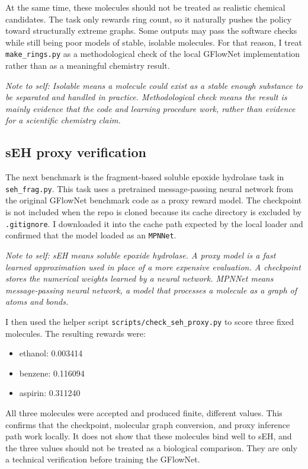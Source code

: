 \documentclass{article}
\begin{document}
At the same time, these molecules should not be treated as realistic chemical candidates. The task only rewards ring count, so it naturally pushes the policy toward structurally extreme graphs. Some outputs may pass the software checks while still being poor models of stable, isolable molecules. For that reason, I treat \texttt{make\_rings.py} as a methodological check of the local GFlowNet implementation rather than as a meaningful chemistry result.

\textit{Note to self: Isolable means a molecule could exist as a stable enough substance to be separated and handled in practice. Methodological check means the result is mainly evidence that the code and learning procedure work, rather than evidence for a scientific chemistry claim.}

\subsection{sEH proxy verification}
The next benchmark is the fragment-based soluble epoxide hydrolase task in \texttt{seh\_frag.py}. This task uses a pretrained message-passing neural network from the original GFlowNet benchmark code as a proxy reward model. The checkpoint is not included when the repo is cloned because its cache directory is excluded by \texttt{.gitignore}. I downloaded it into the cache path expected by the local loader and confirmed that the model loaded as an \texttt{MPNNet}.

\textit{Note to self: sEH means soluble epoxide hydrolase. A proxy model is a fast learned approximation used in place of a more expensive evaluation. A checkpoint stores the numerical weights learned by a neural network. MPNNet means message-passing neural network, a model that processes a molecule as a graph of atoms and bonds.}

I then used the helper script \texttt{scripts/check\_seh\_proxy.py} to score three fixed molecules. The resulting rewards were:

\begin{itemize}
    \item ethanol: 0.003414
    \item benzene: 0.116094
    \item aspirin: 0.311240
\end{itemize}

All three molecules were accepted and produced finite, different values. This confirms that the checkpoint, molecular graph conversion, and proxy inference path work locally. It does not show that these molecules bind well to sEH, and the three values should not be treated as a biological comparison. They are only a technical verification before training the GFlowNet.
\end{document}
